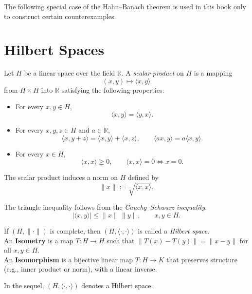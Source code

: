 \documentclass[../Main.tex]{subfiles}
\begin{document}
The following special case of the Hahn--Banach theorem is used in this book only to construct certain counterexamples.


\section{Hilbert Spaces}

Let $H$ be a linear space over the field $\mathbb{R}$. A \emph{scalar product} on $H$ is a mapping
\[
(x,y)\mapsto \langle x,y\rangle
\]
from $H\times H$ into $\mathbb{R}$ satisfying the following properties:

\begin{itemize}
    \item For every $x,y\in H$,
    \[
    \langle x,y\rangle = \langle y,x\rangle.
    \]
    \item For every $x,y,z\in H$ and $a\in\mathbb{R}$,
    \[
    \langle x,y+z\rangle = \langle x,y\rangle+\langle x,z\rangle,
    \qquad
    \langle ax,y\rangle = a\langle x,y\rangle.
    \]
    \item For every $x\in H$,
    \[
    \langle x,x\rangle \geq 0,
    \qquad
    \langle x,x\rangle = 0 \Longleftrightarrow x=0.
    \]
\end{itemize}

The scalar product induces a norm on $H$ defined by
\[
\|x\|:=\sqrt{\langle x,x\rangle}.
\]

The triangle inequality follows from the \emph{Cauchy--Schwarz inequality}:
\[
|\langle x,y\rangle| \leq \|x\|\,\|y\|,
\qquad x,y\in H.
\]

If $(H,\|\cdot\|)$ is complete, then $(H,\langle\cdot,\cdot\rangle)$ is called a \emph{Hilbert space}.\\
An \textbf{Isometry} is a map \(T: H \to H\) such that \(\|T(x) - T(y)\| = \|x - y\|\) for all \(x,y \in H\). \\ 
An \textbf{Isomorphism} is a bijective linear map \(T: H \to K\) that preserves structure (e.g., inner product or norm), with a linear inverse.
    
In the sequel, $(H,\langle\cdot,\cdot\rangle)$ denotes a Hilbert space.
\end{document}
